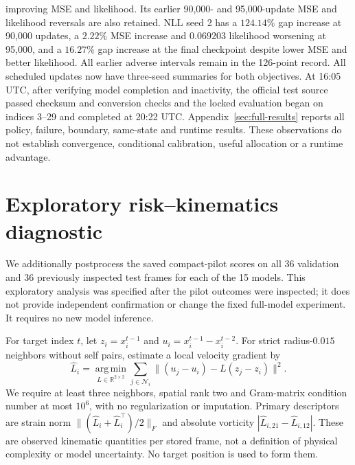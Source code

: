 improving MSE and likelihood. Its earlier 90,000- and 95,000-update MSE
and likelihood reversals are also retained. NLL seed 2 has a
$124.14\%$ gap increase at 90,000 updates, a $2.22\%$ MSE increase
and $0.069203$ likelihood worsening at 95,000, and a $16.27\%$ gap
increase at the final checkpoint despite lower MSE and better likelihood.
All earlier adverse intervals remain in the 126-point record.
All scheduled updates now have three-seed summaries for both objectives.
At 16:05 UTC, after verifying model completion and inactivity, the
official test source passed checksum and conversion checks and the locked
evaluation began on indices 3--29 and completed at 20:22 UTC.
Appendix~\ref{sec:full-results} reports all policy, failure, boundary,
same-state and runtime results. These observations
do not establish convergence, conditional calibration, useful allocation
or a runtime advantage.






\section{Exploratory risk--kinematics diagnostic}
\label{sec:physical-rank}
We additionally postprocess the saved compact-pilot scores on all 36 validation
and 36 previously inspected test frames for each of the 15 models. This
exploratory analysis was specified after the pilot outcomes were inspected;
it does not provide independent confirmation or change the fixed full-model
experiment. It requires no new model inference.

For target index $t$, let $z_i=x_i^{t-1}$ and
$u_i=x_i^{t-1}-x_i^{t-2}$. For strict radius-$0.015$ neighbors without self
pairs, estimate a local velocity gradient by
\begin{equation}
 \widehat L_i=\operatorname*{arg\,min}_{L\in\mathbb R^{2\times2}}
       \sum_{j\in\mathcal N_i}\|(u_j-u_i)-L(z_j-z_i)\|^2.
\end{equation}
We require at least three neighbors, spatial rank two and Gram-matrix
condition number at most $10^6$, with no regularization or imputation.
Primary descriptors are strain norm
$\|({\widehat L_i+\widehat L_i^\top})/2\|_F$ and absolute vorticity
$|\widehat L_{i,21}-\widehat L_{i,12}|$. These are observed kinematic
quantities per stored frame, not a definition of physical complexity or
model uncertainty. No target position is used to form them.

